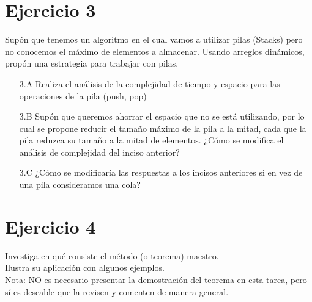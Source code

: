 \documentclass[12pt]{article}
\begin{document}
\section*{Ejercicio 3}
Supón que tenemos un algoritmo en el cual vamos a utilizar pilas (Stacks) pero no conocemos el máximo de elementos a almacenar. Usando arreglos dinámicos, propón una estrategia para trabajar con pilas.
\begin{itemize}
    \item[3.A] Realiza el análisis de la complejidad de tiempo y espacio para las operaciones de la pila (push, pop)
    \item[3.B] Supón que queremos ahorrar el espacio que no se está utilizando, por lo cual se propone reducir el tamaño máximo de la pila a la mitad, cada que la pila reduzca su tamaño a la mitad de elementos. ¿Cómo se modifica el análisis de complejidad del inciso anterior?
    \item[3.C] ¿Cómo se modificaría las respuestas a los incisos anteriores si en vez de una pila consideramos una cola?
\end{itemize}
\section*{Ejercicio 4}
Investiga en qué consiste el método (o teorema) maestro.\\
Ilustra su aplicación con algunos ejemplos.\\
Nota: NO es necesario presentar la demostración del teorema en esta tarea, pero sí es deseable que la revisen y comenten de manera general.
\end{document}
